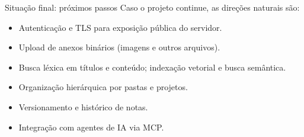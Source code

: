 \documentclass[aspectratio=169]{beamer}
\begin{document}
\begin{frame}{Situação final: próximos passos}
    Caso o projeto continue, as direções naturais são:
    \begin{itemize}
        \item Autenticação e TLS para exposição pública do servidor.
        \item Upload de anexos binários (imagens e outros arquivos).
        \item Busca léxica em títulos e conteúdo; indexação vetorial e busca semântica.
        \item Organização hierárquica por pastas e projetos.
        \item Versionamento e histórico de notas.
        \item Integração com agentes de IA via MCP.
    \end{itemize}
\end{frame}
\end{document}
